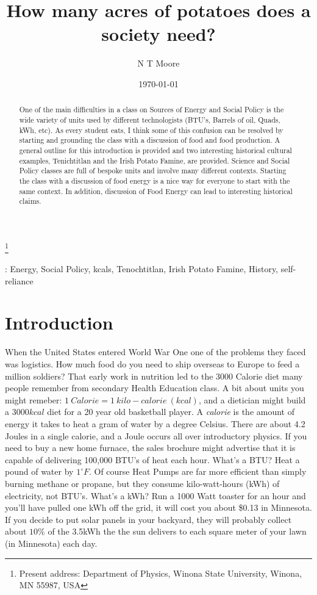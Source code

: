 \documentclass[12pt]{iopart}
\begin{document}
\title[How many acres of potatoes does a society need?]{How many acres of potatoes does a society need?}
\author{N T Moore}
\footnote{Present address:
Department of Physics, Winona State University, Winona, MN 55987, USA}
\date{\today}
\begin{abstract}
One of the main difficulties in a class on Sources of Energy and Social Policy is the wide variety of units used by different technologists (BTU's, Barrels of oil, Quads, kWh, etc).  As every student eats, I think some of this confusion can be resolved by starting and grounding the class with a discussion of food and food production.  A general outline for this introduction is provided and two interesting historical cultural examples, Tenichtitlan and the Irish Potato Famine, are provided.  
Science and Social Policy classes are full of bespoke units and involve many different contexts.  Starting the class with a discussion of food energy is a nice way for everyone to start with the same context.  In addition, discussion of Food Energy can lead to interesting historical claims. 
\end{abstract}
: Energy, Social Policy, kcals, Tenochtitlan, Irish Potato Famine, History, self-reliance
\submitto{\PED}
\maketitle

\section{Introduction}
When the United States entered World War One one of the problems they faced was logistics.  How much food do you need to ship overseas to Europe to feed a million soldiers?  That early work in nutrition led to the 3000 Calorie diet many people remember from secondary Health Education class.  A bit about units you might remeber: $1~Calorie = 1~kilo-calorie~(kcal)$, and a dietician might build a $3000 kcal$ diet for a 20 year old basketball player.  A \textit{calorie} is the amount of energy it takes  to heat a gram of water by a degree Celsius.  There are about 4.2 Joules in a single calorie, and a Joule occurs all over introductory  physics.  If you need to buy a new home furnace, the sales brochure might advertise that it is capable of delivering 100,000 BTU's of heat each hour.  What's a BTU? Heat a pound of water by $1^{\circ}F$.  Of course Heat Pumps are far more efficient than simply burning methane or propane, but they consume kilo-watt-hours (kWh) of electricity, not BTU's.  What's a kWh?  Run a 1000 Watt toaster for an hour and you'll have pulled one kWh off the grid, it will cost you about \$0.13 in Minnesota.  If you decide to put solar panels in your backyard, they will probably collect about $10\%$ of the 3.5kWh the  the sun delivers to each square meter of your lawn (in Minnesota) each day.  
\end{document}
